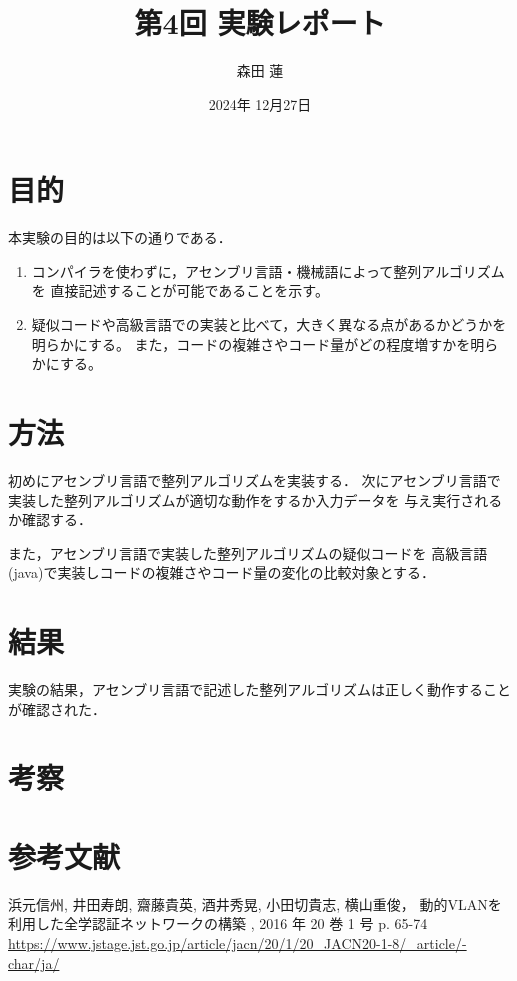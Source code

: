 \documentclass{jlreq}
\title{第4回 実験レポート}
\author{森田 蓮}
\date{2024年 12月27日}
\begin{document}
\maketitle

\section{目的}
本実験の目的は以下の通りである．
\begin{enumerate}
    \item コンパイラを使わずに，アセンブリ言語・機械語によって整列アルゴリズムを
    直接記述することが可能であることを示す。
    \item 疑似コードや高級言語での実装と比べて，大きく異なる点があるかどうかを明らかにする。
    また，コードの複雑さやコード量がどの程度増すかを明らかにする。
\end{enumerate}


\section{方法}
初めにアセンブリ言語で整列アルゴリズムを実装する．
次にアセンブリ言語で実装した整列アルゴリズムが適切な動作をするか入力データを
与え実行されるか確認する．

また，アセンブリ言語で実装した整列アルゴリズムの疑似コードを
高級言語(java)で実装しコードの複雑さやコード量の変化の比較対象とする．
  

\section{結果}
実験の結果，アセンブリ言語で記述した整列アルゴリズムは正しく動作することが確認された．


\section{考察}

 

\section*{参考文献}
浜元信州, 井田寿朗, 齋藤貴英, 酒井秀晃, 小田切貴志, 横山重俊，
動的VLANを利用した全学認証ネットワークの構築  
, 2016 年 20 巻 1 号 p. 65-74  
\url{https://www.jstage.jst.go.jp/article/jacn/20/1/20_JACN20-1-8/_article/-char/ja/}
\end{document}
